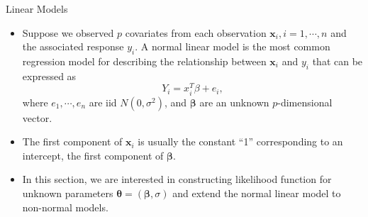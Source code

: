 \documentclass{beamer}
\begin{document}
    
\begin{frame}{Linear Models}
        \begin{itemize}
            \item Suppose we observed $p$ covariates from each observation $\boldsymbol{x}_{i}, i = 1, \cdots, n$ and the associated response $y_{i}$. A normal linear model is the most common regression model for describing the relationship between $\boldsymbol{x}_{i}$ and $y_{i}$ that can be expressed as 
            \begin{equation}
               Y_{i} = x^{T}_{i}\beta + e_{i}, \label{eq: normalM}
            \end{equation}
            where $e_{1}, \cdots, e_{n}$ are iid $N(0, \sigma^2)$, and $\boldsymbol{\beta}$ are an unknown $p$-dimensional vector.
            \item The first component of $\boldsymbol{x}_{i}$ is usually the constant “1” corresponding to an intercept, the first component of $\boldsymbol{\beta}$.
            \item In this section, we are interested in constructing likelihood function for unknown parameters $\boldsymbol{\theta} = (\boldsymbol{\beta}, \sigma)$ and extend the normal linear model to non-normal models.
        \end{itemize}
    \end{frame}
\end{document}

